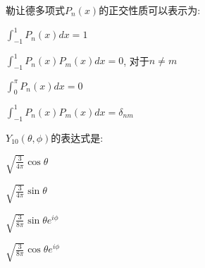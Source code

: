 \documentclass{njustexam}
\begin{document}

\begin{problem}
  勒让德多项式$P_n(x)$的正交性质可以表示为:
  \begin{abcd}
    \item $\int_{-1}^{1} P_n(x) dx = 1$

    \item $\int_{-1}^{1} P_n(x) P_m(x) dx = 0$, 对于$n \neq m$
    
    \item $\int_{0}^{\pi} P_n(x) dx = 0$
    
    \item $\int_{-1}^{1} P_n(x) P_m(x) dx = \delta_{nm}$
  \end{abcd}
\end{problem}

\begin{problem}
  $Y_{10}(\theta,  \phi)$的表达式是:
\begin{abcd}
  \item $\sqrt{\frac{3}{4\pi}} \cos \theta$
  \item $\sqrt{\frac{3}{4\pi}} \sin \theta$
  \item $\sqrt{\frac{3}{8\pi}} \sin \theta e^{i\phi}$
  \item $\sqrt{\frac{3}{8\pi}} \cos \theta e^{i\phi}$
\end{abcd}
\end{problem}

\end{document}
